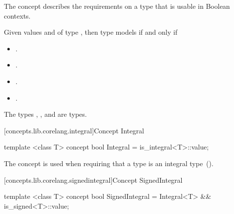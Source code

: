 \begin{addedblock}
\pnum
The  concept describes the requirements on a type that is usable in Boolean contexts.

\pnum
Given values  and  of type , then type  models  if and only if

\begin{itemize}
\item {}.
\item {}.
\item {}\oldtxt{ == }
      .
\item {}\oldtxt{ == }
      .
\end{itemize}

{\color{newclr}\enterexample The types , , and
 are  types.\exitexample}

[concepts.lib.corelang.integral]{Concept Integral}

%
\begin{itemdecl}
template <class T>
concept bool Integral = is_integral<T>::value;
\end{itemdecl}

\begin{itemdescr}
{\color{oldclr}
\pnum
The  concept is used when requiring that a type  is an
integral type~().
}
\end{itemdescr}

[concepts.lib.corelang.signedintegral]{Concept SignedIntegral}

%
\begin{itemdecl}
template <class T>
concept bool SignedIntegral =
  Integral<T> && is_signed<T>::value;
\end{itemdecl}


\end{addedblock}
